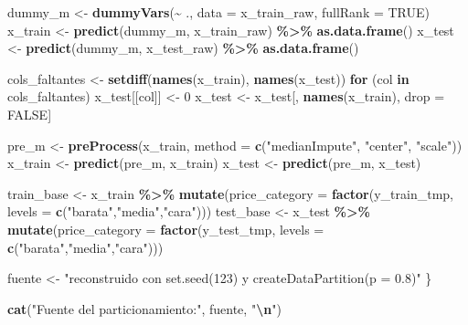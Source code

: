 \documentclass[
]{article}
\newenvironment{Shaded}{\begin{snugshade}}{\end{snugshade}}
\newcommand{\AttributeTok}[1]{\textcolor[rgb]{0.13,0.29,0.53}{#1}}
\newcommand{\ConstantTok}[1]{\textcolor[rgb]{0.56,0.35,0.01}{#1}}
\newcommand{\ControlFlowTok}[1]{\textcolor[rgb]{0.13,0.29,0.53}{\textbf{#1}}}
\newcommand{\DecValTok}[1]{\textcolor[rgb]{0.00,0.00,0.81}{#1}}
\newcommand{\FunctionTok}[1]{\textcolor[rgb]{0.13,0.29,0.53}{\textbf{#1}}}
\newcommand{\NormalTok}[1]{#1}
\newcommand{\OtherTok}[1]{\textcolor[rgb]{0.56,0.35,0.01}{#1}}
\newcommand{\SpecialCharTok}[1]{\textcolor[rgb]{0.81,0.36,0.00}{\textbf{#1}}}
\newcommand{\StringTok}[1]{\textcolor[rgb]{0.31,0.60,0.02}{#1}}
\begin{document}
\begin{Shaded}
\begin{Highlighting}[]
\NormalTok{  dummy\_m }\OtherTok{\textless{}{-}} \FunctionTok{dummyVars}\NormalTok{(}\SpecialCharTok{\textasciitilde{}}\NormalTok{ ., }\AttributeTok{data =}\NormalTok{ x\_train\_raw, }\AttributeTok{fullRank =} \ConstantTok{TRUE}\NormalTok{)}
\NormalTok{  x\_train }\OtherTok{\textless{}{-}} \FunctionTok{predict}\NormalTok{(dummy\_m, x\_train\_raw) }\SpecialCharTok{\%\textgreater{}\%} \FunctionTok{as.data.frame}\NormalTok{()}
\NormalTok{  x\_test  }\OtherTok{\textless{}{-}} \FunctionTok{predict}\NormalTok{(dummy\_m, x\_test\_raw)  }\SpecialCharTok{\%\textgreater{}\%} \FunctionTok{as.data.frame}\NormalTok{()}

\NormalTok{  cols\_faltantes }\OtherTok{\textless{}{-}} \FunctionTok{setdiff}\NormalTok{(}\FunctionTok{names}\NormalTok{(x\_train), }\FunctionTok{names}\NormalTok{(x\_test))}
  \ControlFlowTok{for}\NormalTok{ (col }\ControlFlowTok{in}\NormalTok{ cols\_faltantes) x\_test[[col]] }\OtherTok{\textless{}{-}} \DecValTok{0}
\NormalTok{  x\_test }\OtherTok{\textless{}{-}}\NormalTok{ x\_test[, }\FunctionTok{names}\NormalTok{(x\_train), drop }\OtherTok{=} \ConstantTok{FALSE}\NormalTok{]}

\NormalTok{  pre\_m   }\OtherTok{\textless{}{-}} \FunctionTok{preProcess}\NormalTok{(x\_train, }\AttributeTok{method =} \FunctionTok{c}\NormalTok{(}\StringTok{"medianImpute"}\NormalTok{, }\StringTok{"center"}\NormalTok{, }\StringTok{"scale"}\NormalTok{))}
\NormalTok{  x\_train }\OtherTok{\textless{}{-}} \FunctionTok{predict}\NormalTok{(pre\_m, x\_train)}
\NormalTok{  x\_test  }\OtherTok{\textless{}{-}} \FunctionTok{predict}\NormalTok{(pre\_m, x\_test)}

\NormalTok{  train\_base }\OtherTok{\textless{}{-}}\NormalTok{ x\_train }\SpecialCharTok{\%\textgreater{}\%} \FunctionTok{mutate}\NormalTok{(}\AttributeTok{price\_category =} \FunctionTok{factor}\NormalTok{(y\_train\_tmp, }\AttributeTok{levels =} \FunctionTok{c}\NormalTok{(}\StringTok{"barata"}\NormalTok{,}\StringTok{"media"}\NormalTok{,}\StringTok{"cara"}\NormalTok{)))}
\NormalTok{  test\_base  }\OtherTok{\textless{}{-}}\NormalTok{ x\_test  }\SpecialCharTok{\%\textgreater{}\%} \FunctionTok{mutate}\NormalTok{(}\AttributeTok{price\_category =} \FunctionTok{factor}\NormalTok{(y\_test\_tmp,  }\AttributeTok{levels =} \FunctionTok{c}\NormalTok{(}\StringTok{"barata"}\NormalTok{,}\StringTok{"media"}\NormalTok{,}\StringTok{"cara"}\NormalTok{)))}

\NormalTok{  fuente }\OtherTok{\textless{}{-}} \StringTok{"reconstruido con set.seed(123) y createDataPartition(p = 0.8)"}
\NormalTok{\}}

\FunctionTok{cat}\NormalTok{(}\StringTok{"Fuente del particionamiento:"}\NormalTok{, fuente, }\StringTok{"}\SpecialCharTok{\textbackslash{}n}\StringTok{"}\NormalTok{)}
\end{Highlighting}
\end{Shaded}
\end{document}
